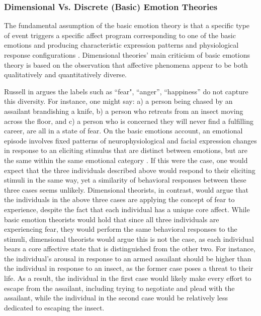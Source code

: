 \documentclass[12pt]{report}
\begin{document}
\subsubsection{Dimensional Vs. Discrete (Basic) Emotion Theories}

The fundamental assumption of the basic emotion theory is that a specific type
of event triggers a specific affect program corresponding to one of the basic
emotions and producing characteristic expression patterns and physiological
response configurations \cite{scherer:emotions-emergent}. Dimensional theories'
main criticism of basic emotions theory is based on the observation that
affective phenomena appear to be both qualitatively and quantitatively diverse.

Russell in \cite{russell:core-affect} argues the labels such as ``fear",
``anger'', ``happiness'' do not capture this diversity. For instance, one might
say: a) a person being chased by an assailant brandishing a knife, b) a person
who retreats from an insect moving across the floor, and c) a person who is
concerned they will never find a fulfilling career, are all in a state of
fear. On the basic emotions account, an emotional episode involves fixed
patterns of neurophysiological and facial expression changes in response to an
eliciting stimulus that are distinct between emotions, but are the same within
the same emotional category \cite{ekman:argument-emotions}. If this were the
case, one would expect that the three individuals described above would respond
to their eliciting stimuli in the same way, yet a similarity of behavioral
responses between these three cases seems unlikely. Dimensional theorists, in
contrast, would argue that the individuals in the above three cases are applying
the concept of fear to experience, despite the fact that each individual has a
unique core affect. While basic emotion theorists would hold that since all
three individuals are experiencing fear, they would perform the same behavioral
responses to the stimuli, dimensional theorists would argue this is not the
case, as each individual bears a core affective state that is distinguished from
the other two. For instance, the individual's arousal in response to an armed
assailant should be higher than the individual in response to an insect, as the
former case poses a threat to their life. As a result, the individual in the
first case would likely make every effort to escape from the assailant,
including trying to negotiate and plead with the assailant, while the individual
in the second case would be relatively less dedicated to escaping the insect. 
\end{document}
